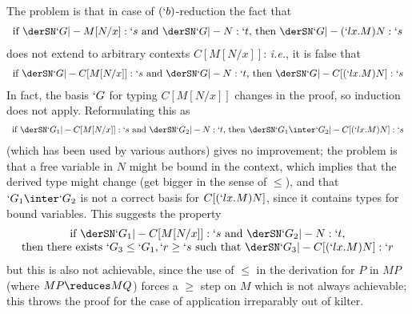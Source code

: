 \documentclass{lmcs}
\begin{document}
The problem is that in case of $(`b)$-reduction the fact that
 \[ \begin{array}{c}
\textrm{if }\derSN `G |- M[N/x] : `s \textrm{ and } \derSN `G |- N : `t \textrm{, then }\derSN `G |- (`l x.M)N : `s 
 \end{array} \]
does not extend to arbitrary contexts $C[M[N/x]]$: \emph{i.e.}, it is false that
 \[ \begin{array}{c}
\textrm{if }\derSN `G |- C[M[N/x]] : `s \textrm{ and } \derSN `G |- N : `t \textrm{, then }\derSN `G |- C[(`l x.M)N] : `s 
 \end{array} \]
In fact, the basis $`G$ for typing $C[M[N/x]] $ changes in the proof, so induction does not apply.
Reformulating this as 
%
 \[ \begin{array}{c}
\textrm{if }\derSN `G_1 |- C[M[N/x]] : `s \textrm{ and }\derSN `G_2 |- N : `t \textrm{, then }\derSN `G_1\inter `G_2 |- C[(`l x.M)N] : `s 
 \end{array} \]
(which has been used by various authors)
gives no improvement; the problem is that a free variable in $N$ might be bound in the context, which implies that the derived type might change (get bigger in the sense of $\leq$), and that $`G_1\inter `G_2$ is not a correct basis for $C[(`l x.M)N]$, since it contains types for bound variables.
This suggests the property 
%
 \[ \begin{array}{c}
\textrm{if }\derSN `G_1 |- C[M[N/x]] : `s \textrm{ and } \derSN `G_2 |- N : `t , \\ \textrm{then there exists }`G_3 \leq `G_1, `r \geq `s \textrm{ such that }\derSN `G_3 |- C[(`l x.M)N] : `r 
 \end{array} \]
but this is also not achievable, since the use of $\leq$ in the derivation for $P$ in $MP$ (where $MP \reduces MQ$) forces a $\geq$ step on $M$ which is not always achievable; this throws the proof for the case of application irreparably out of kilter.
\end{document}

